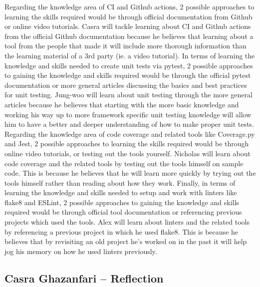 \documentclass[12pt, titlepage]{article}
\begin{document}
\begin{enumerate}
    Regarding the knowledge area of CI and Github actions, 2 possible approaches 
    to learning the skills required would be through official documentation from 
    Github or online video tutorials. Casra will tackle learning about CI and 
    Github actions from the official Github documentation because he believes that 
    learning about a tool from the people that made it will include more thorough 
    information than the learning material of a 3rd party (ie. a video tutorial). 
    In terms of learning the knowledge and skills needed to create unit tests via 
    pytest, 2 possible approaches to gaining the knowledge and skills required would 
    be through the official pytest documentation or more general articles discussing 
    the basics and best practices for unit testing. Jung-woo will learn about unit 
    testing through the more general articles because he believes that starting with 
    the more basic knowledge and working his way up to more framework specific unit 
    testing knowledge will allow him to have a better and deeper understanding of 
    how to make proper unit tests. Regarding the knowledge area of code coverage and 
    related tools like Coverage.py and Jest, 2 possible approaches to learning the 
    skills required would be through online video tutorials, or testing out the 
    tools yourself. Nicholas will learn about code coverage and the related tools 
    by testing out the tools himself on sample code. This is because he believes 
    that he will learn more quickly by trying out the tools himself rather than 
    reading about how they work. Finally, in terms of learning the knowledge and 
    skills needed to setup and work with linters like flake8 and ESLint, 2 possible 
    approaches to gaining the knowledge and skills required would be through 
    official tool documentation or referencing previous projects which used the 
    tools. Alex will learn about linters and the related tools by referencing a 
    previous project in which he used flake8. This is because he believes that by 
    revisiting an old project he’s worked on in the past it will help jog his memory 
    on how he used linters previously.
\end{enumerate}

\subsection*{Casra Ghazanfari -- Reflection}
\end{document}
